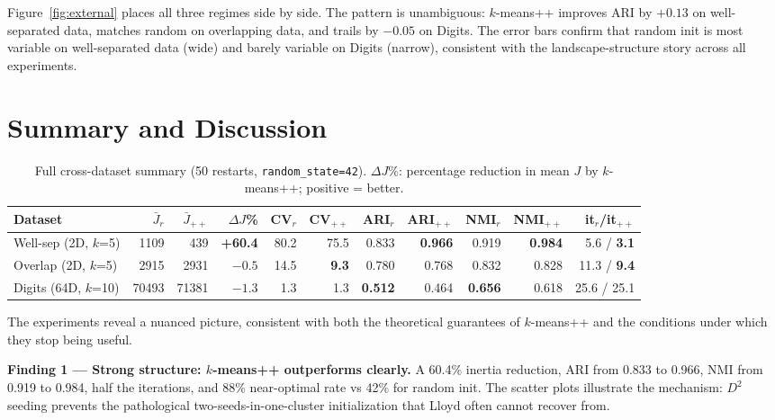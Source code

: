 \documentclass[11pt,a4paper]{article}
\begin{document}
Figure~\ref{fig:external} places all three regimes side by side. The pattern is
unambiguous: $k$-means++ improves ARI by $+0.13$ on well-separated data, matches random
on overlapping data, and trails by $-0.05$ on Digits. The error bars confirm that random
init is most variable on well-separated data (wide) and barely variable on Digits (narrow),
consistent with the landscape-structure story across all experiments.

\section{Summary and Discussion}

\begin{table}[H]
\centering\small
\caption{Full cross-dataset summary (50 restarts, \texttt{random\_state=42}).
  $\Delta J\%$: percentage reduction in mean $J$ by $k$-means++; positive = better.}
\label{tab:summary}
\setlength{\tabcolsep}{4.5pt}
\begin{tabular}{lrrrrrrrrrr}
\toprule
\textbf{Dataset} & $\bar{J}_r$ & $\bar{J}_{++}$ & $\Delta J$\%
  & CV$_r$ & CV$_{++}$ & ARI$_r$ & ARI$_{++}$ & NMI$_r$ & NMI$_{++}$
  & it$_r$/it$_{++}$ \\
\midrule
Well-sep (2D, $k$=5) & 1109 & 439
  & \textbf{+60.4} & 80.2 & 75.5 & 0.833 & \textbf{0.966}
  & 0.919 & \textbf{0.984} & 5.6 / \textbf{3.1} \\
Overlap (2D, $k$=5) & 2915 & 2931
  & $-0.5$ & 14.5 & \textbf{9.3} & 0.780 & 0.768
  & 0.832 & 0.828 & 11.3 / \textbf{9.4} \\
Digits (64D, $k$=10) & 70493 & 71381
  & $-1.3$ & 1.3 & 1.3 & \textbf{0.512} & 0.464
  & \textbf{0.656} & 0.618 & 25.6 / 25.1 \\
\bottomrule
\end{tabular}
\end{table}

The experiments reveal a nuanced picture, consistent with both the theoretical
guarantees of $k$-means++ and the conditions under which they stop being useful.

\textbf{Finding 1 — Strong structure: $k$-means++ outperforms clearly.}
A 60.4\% inertia reduction, ARI from 0.833 to 0.966, NMI from 0.919 to 0.984, half the
iterations, and 88\% near-optimal rate vs 42\% for random init. The scatter plots
illustrate the mechanism: $D^2$ seeding prevents the pathological two-seeds-in-one-cluster
initialization that Lloyd often cannot recover from.
\end{document}
